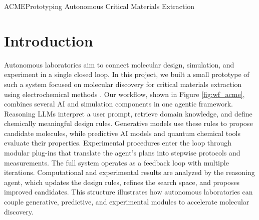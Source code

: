 \begin{teamsubmission}{ACME}{Prototyping Autonomous Critical Materials Extraction}

\section*{Introduction}
Autonomous laboratories aim to connect molecular design, simulation, and experiment in a single closed loop. In this  project, we built a small prototype of such a system focused on molecular discovery for  critical materials extraction using electrochemical methods \cite{shukla2025alizarin}. Our workflow, shown in Figure \ref{fig:wf_acme}, combines several AI and simulation components in one agentic framework. Reasoning LLMs interpret a user prompt, retrieve domain knowledge, and define chemically meaningful design rules. Generative models use these rules to propose candidate molecules, while predictive AI models and quantum chemical tools evaluate their properties. Experimental procedures enter the loop through modular plug-ins that translate the agent’s plans into stepwise protocols and measurements. The full system operates as a feedback loop with multiple iterations. Computational and experimental results are analyzed by the reasoning agent, which updates the design rules, refines the search space, and proposes improved candidates. This structure illustrates how autonomous laboratories can couple generative, predictive, and experimental modules to accelerate molecular discovery.


\end{teamsubmission}
